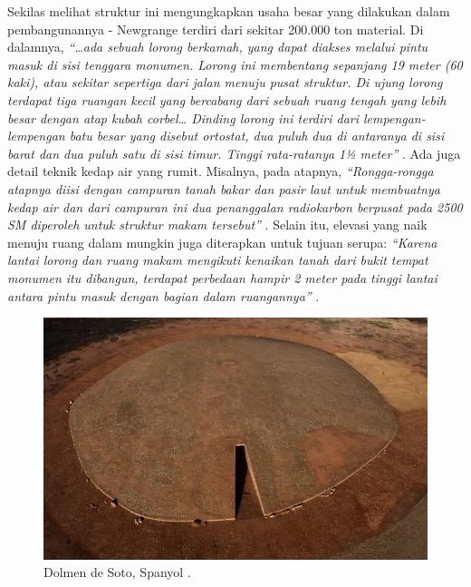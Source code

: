 \documentclass[10pt,twocolumn,letterpaper]{article}
\begin{document}
Sekilas melihat struktur ini mengungkapkan usaha besar yang dilakukan dalam pembangunannya - Newgrange terdiri dari sekitar 200.000 ton material. Di dalamnya, \textit{“…ada sebuah lorong berkamah, yang dapat diakses melalui pintu masuk di sisi tenggara monumen. Lorong ini membentang sepanjang 19 meter (60 kaki), atau sekitar sepertiga dari jalan menuju pusat struktur. Di ujung lorong terdapat tiga ruangan kecil yang bercabang dari sebuah ruang tengah yang lebih besar dengan atap kubah corbel… Dinding lorong ini terdiri dari lempengan-lempengan batu besar yang disebut ortostat, dua puluh dua di antaranya di sisi barat dan dua puluh satu di sisi timur. Tinggi rata-ratanya 1½ meter”} \cite{70}. Ada juga detail teknik kedap air yang rumit. Misalnya, pada atapnya, \textit{“Rongga-rongga atapnya diisi dengan campuran tanah bakar dan pasir laut untuk membuatnya kedap air dan dari campuran ini dua penanggalan radiokarbon berpusat pada 2500 SM diperoleh untuk struktur makam tersebut”} \cite{71}. Selain itu, elevasi yang naik menuju ruang dalam mungkin juga diterapkan untuk tujuan serupa: \textit{“Karena lantai lorong dan ruang makam mengikuti kenaikan tanah dari bukit tempat monumen itu dibangun, terdapat perbedaan hampir 2 meter pada tinggi lantai antara pintu masuk dengan bagian dalam ruangannya”} \cite{71}.

\begin{figure}[b]
\begin{center}
   \includegraphics[width=1\linewidth]{dolmen.jpg}
\end{center}
   \caption{Dolmen de Soto, Spanyol \cite{53}.}
\label{fig:9}
\label{fig:onecol}
\end{figure}
\end{document}
